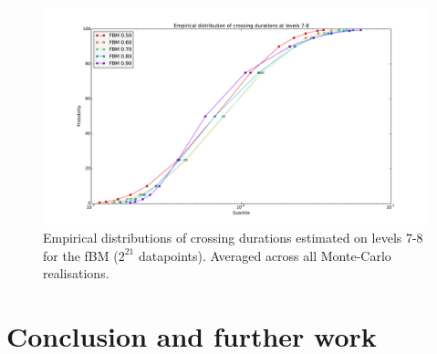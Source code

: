 \documentclass[a4paper]{article}
\begin{document}
\begin{figure}[htb]\begin{center}
    \includegraphics[width=6in]{images/fig_10_med_FBM}
    \caption{Empirical distributions of crossing durations estimated on levels 7-8
    for the fBM ($2^{21}$ datapoints). Averaged across all Monte-Carlo realisations.}
\label{fig:fbm_quantiles_durations}
\end{center}\end{figure}



\section{Conclusion and further work} %
\label{sec:conlusion_and_further_work}
\end{document}

